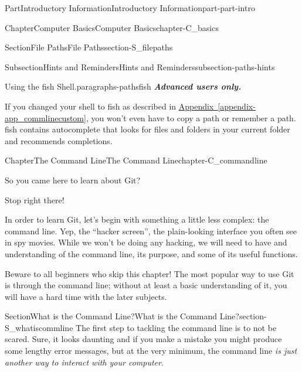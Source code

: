 \documentclass[oneside,10pt,]{book}
\newcommand{\xreffont}{\relax}
\newcommand{\alert}[1]{\textbf{\textit{#1}}}
\begin{document}
\begin{partptx}{Part}{Introductory Information}{}{Introductory Information}{}{}{part-part-intro}
\begin{chapterptx}{Chapter}{Computer Basics}{}{Computer Basics}{}{}{chapter-C_basics}
\begin{sectionptx}{Section}{File Paths}{}{File Paths}{}{}{section-S_filepaths}
\begin{subsectionptx}{Subsection}{Hints and Reminders}{}{Hints and Reminders}{}{}{subsection-paths-hints}
\begin{paragraphs}{Using the fish Shell.}{paragraphs-pathsfish}
%
%
\alert{Advanced users only.}%
\par
If you changed your shell to fish as described in \hyperref[appendix-app_commlinecustom]{Appendix~{\xreffont\ref{appendix-app_commlinecustom}}}, you won't even have to copy a path or remember a path. fish contains autocomplete that looks for files and folders in your current folder and recommends completions.%
\end{paragraphs}%
\end{subsectionptx}
\end{sectionptx}
\end{chapterptx}
%
\typeout{************************************************}
\typeout{************************************************}
%
\begin{chapterptx}{Chapter}{The Command Line}{}{The Command Line}{}{}{chapter-C_commandline}
\renewcommand*{\chaptername}{Chapter}
\begin{introduction}{}%
So you came here to learn about Git?%
\par
Stop right there!%
\par
In order to learn Git, let's begin with something a little less complex: the command line. Yep, the ``hacker screen'', the plain-looking interface you often see in spy movies. While we won't be doing any hacking, we will need to have and understanding of the command line, its purpose, and some of its useful functions.%
\par
Beware to all beginners who skip this chapter! The most popular way to use Git is through the command line; without at least a basic understanding of it, you will have a hard time with the later subjects.%
\end{introduction}%
%
%
\typeout{************************************************}
\typeout{************************************************}
%
\begin{sectionptx}{Section}{What is the Command Line?}{}{What is the Command Line?}{}{}{section-S_whatiscommline}
%
%
%
%
%
The first step to tackling the command line is to not be scared. Sure, it looks daunting and if you make a mistake you might produce some lengthy error messages, but at the very minimum, the command line \emph{is just another way to interact with your computer}.%
\par

\end{sectionptx}
\end{chapterptx}
\end{partptx}
\end{document}
